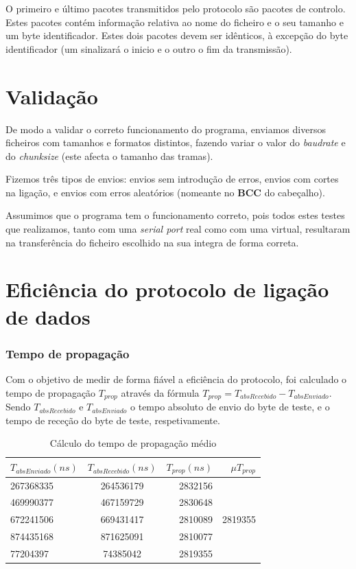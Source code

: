 \documentclass[11pt]{report}
\begin{document}
O primeiro e último pacotes transmitidos pelo protocolo são pacotes de controlo.
Estes pacotes contém informação relativa ao nome do ficheiro e o seu tamanho e
um byte identificador. Estes dois pacotes devem ser idênticos, à excepção do byte
identificador (um sinalizará o inicio e o outro o fim da transmissão).

{\let\clearpage\relax \chapter{Validação}}

De modo a validar o correto funcionamento do programa, enviamos diversos ficheiros
com tamanhos e formatos distintos, fazendo variar o valor do \textit{baudrate}
e do \textit{chunksize} (este afecta o tamanho das tramas).

Fizemos três tipos de envios: envios sem introdução de erros, envios com cortes
na ligação, e envios com erros aleatórios (nomeante no \textbf{BCC} do cabeçalho).

Assumimos que o programa tem o funcionamento correto, pois todos estes testes
que realizamos, tanto com uma \textit{serial port} real como com uma virtual,
resultaram na transferência do ficheiro escolhido na sua integra de forma correta.

\chapter{Eficiência do protocolo de ligação de dados}

\subsection{Tempo de propagação}

Com o objetivo de medir de forma fiável a eficiência do protocolo, foi calculado
o tempo de propagação $T_{prop}$ através da fórmula
$T_{prop} = T_{absRecebido} - T_{absEnviado}$. Sendo $T_{absRecebido}$ e $T_{absEnviado}$ o tempo
absoluto de envio do byte de teste, e o tempo de receção do byte de teste, respetivamente.

\begin{table}[h!]
  \begin{center}
    \caption{Cálculo do tempo de propagação médio}
    \label{tab:table1}
    \begin{tabular}{l|c|r|r} %
        \textbf{$T_{absEnviado}(ns)$} &\textbf{$T_{absRecebido}(ns)$} & \textbf{$T_{prop}(ns)$} & \textbf{$\mu T_{prop}$}\\
      \hline
      267368335 & 264536179 & 2832156\\
      469990377 & 467159729 & 2830648\\
        672241506 & 669431417 & 2810089 & 2819355\\
      874435168 & 871625091 & 2810077\\
      77204397 & 74385042 & 2819355\\
    \end{tabular}
  \end{center}
\end{table}
\end{document}
